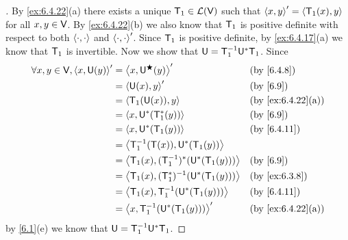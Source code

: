 \begin{proof}[]
  By \cref{ex:6.4.22}(a) there exists a unique \(\mathsf{T}_1 \in \mathcal{L}(\mathsf{V})\) such that \(\left\langle x, y\right\rangle' = \left\langle\mathsf{T}_1(x), y\right\rangle\) for all \(x, y \in \mathsf{V}\).
  By \cref{ex:6.4.22}(b) we also know that \(\mathsf{T}_1\) is positive definite with respect to both \(\left\langle\cdot, \cdot\right\rangle\) and \(\left\langle\cdot, \cdot\right\rangle'\).
  Since \(\mathsf{T}_1\) is positive definite, by \cref{ex:6.4.17}(a) we know that \(\mathsf{T}_1\) is invertible.
  Now we show that \(\mathsf{U} = \mathsf{T}_1^{-1} \mathsf{U}^* \mathsf{T}_1\).
  Since
  \begin{align*}
    \forall x, y \in \V, \inn{x, \U(y)}' & = \inn{x, \U^{\bigstar}(y)}'                  &  & \by{6.4.8}        \\
                                         & = \inn{\U(x), y}'                             &  & \by{6.9}          \\
                                         & = \inn{\T_1(\U(x)), y}                        &  & \by{ex:6.4.22}[a] \\
                                         & = \inn{x, \U^*(\T_1^*(y))}                    &  & \by{6.9}          \\
                                         & = \inn{x, \U^*(\T_1(y))}                      &  & \by{6.4.11}       \\
                                         & = \inn{\T_1^{-1}(\T(x)), \U^*(\T_1(y))}                              \\
                                         & = \inn{\T_1(x), (\T_1^{-1})^*(\U^*(\T_1(y)))} &  & \by{6.9}          \\
                                         & = \inn{\T_1(x), (\T_1^*)^{-1}(\U^*(\T_1(y)))} &  & \by{ex:6.3.8}     \\
                                         & = \inn{\T_1(x), \T_1^{-1}(\U^*(\T_1(y)))}     &  & \by{6.4.11}       \\
                                         & = \inn{x, \T_1^{-1}(\U^*(\T_1(y)))}'          &  & \by{ex:6.4.22}[a]
  \end{align*}
  by \cref{6.1}(e) we know that \(\mathsf{U} = \mathsf{T}_1^{-1} \mathsf{U}^* \mathsf{T}_1\).


\end{proof}
